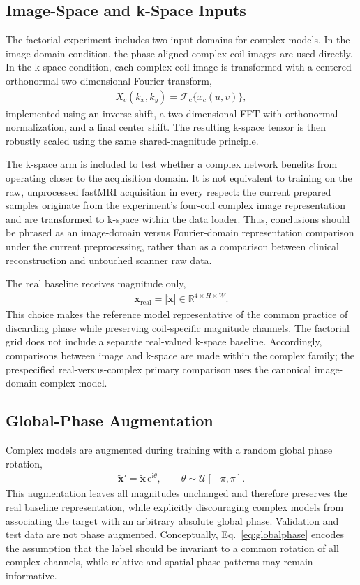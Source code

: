 \documentclass[journal]{IEEEtran}
\begin{document}
\subsection{Image-Space and k-Space Inputs}
The factorial experiment includes two input domains for complex models. In the image-domain condition, the phase-aligned complex coil images are used directly. In the k-space condition, each complex coil image is transformed with a centered orthonormal two-dimensional Fourier transform,
\begin{align}
X_c(k_x,k_y)
= \mathcal{F}_{\mathrm{c}}\{x_c(u,v)\},
\end{align}
implemented using an inverse shift, a two-dimensional \ac{FFT} with orthonormal normalization, and a final center shift. The resulting k-space tensor is then robustly scaled using the same shared-magnitude principle.

The k-space arm is included to test whether a complex network benefits from operating closer to the acquisition domain. It is not equivalent to training on the raw, unprocessed fastMRI acquisition in every respect: the current prepared samples originate from the experiment's four-coil complex image representation and are transformed to k-space within the data loader. Thus, conclusions should be phrased as an image-domain versus Fourier-domain representation comparison under the current preprocessing, rather than as a comparison between clinical reconstruction and untouched scanner raw data.

The real baseline receives magnitude only,
\begin{align}
\mathbf{x}_{\mathrm{real}} = |\tilde{\mathbf{x}}|\in\mathbb{R}^{4\times H\times W}.
\end{align}
This choice makes the reference model representative of the common practice of discarding phase while preserving coil-specific magnitude channels. The factorial grid does not include a separate real-valued k-space baseline. Accordingly, comparisons between image and k-space are made within the complex family; the prespecified real-versus-complex primary comparison uses the canonical image-domain complex model.

\subsection{Global-Phase Augmentation}
Complex models are augmented during training with a random global phase rotation,
\begin{align}
\tilde{\mathbf{x}}' = \tilde{\mathbf{x}}\,\mathrm{e}^{\mathrm{i}\theta},
\qquad \theta\sim\mathcal{U}[-\pi,\pi].
\label{eq:globalphase}
\end{align}
This augmentation leaves all magnitudes unchanged and therefore preserves the real baseline representation, while explicitly discouraging complex models from associating the target with an arbitrary absolute global phase. Validation and test data are not phase augmented. Conceptually, Eq.~\eqref{eq:globalphase} encodes the assumption that the label should be invariant to a common rotation of all complex channels, while relative and spatial phase patterns may remain informative.
\end{document}
